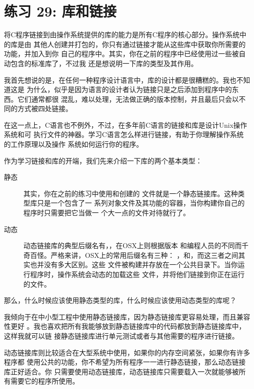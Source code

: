 \chapter{练习 29: 库和链接}

将C程序链接到由操作系统提供的库的能力是所有C程序的核心部分。操作系统中的库是由
其他人创建并打包的，你只有通过链接才能从这些库中获取你所需要的功能，并加入到你
自己的程序中。其实，你在之前的程序中已经使用过一些被自动包含的标准库了，不过我
还是想说明一下库的类型及其作用。

我首先想说的是，在任何一种程序设计语言中，库的设计都是很糟糕的。我也不知道这是
为什么，似乎是因为语言的设计者认为链接只是之后添加到程序中的东西。它们通常都很
混乱，难以处理，无法做正确的版本控制，并且最后只会以不同的方式被四处链接。

在这一点上，C语言也不例外，不过，在多年前C语言的链接和库是设计Unix操作系统和可
执行文件的神器。学习C语言怎么样进行链接，有助于你理解操作系统的工作原理以及操作
系统如何运行你的程序。

作为学习链接和库的开端，我们先来介绍一下库的两个基本类型：

\begin{description}
\item[静态] 其实，你在之前的练习中使用和创建的
    文件就是一个静态链接库。这种类型库只是一个包含了一
    系列对象文件及其功能的容器，当你构建你自己的程序时只需要把它当做一
    个大一点的文件对待就行了。
\item[动态] 动态链接库的典型后缀名有，，在OSX上则根据版本
    和编程人员的不同而千奇百怪。严格来讲，OSX上的常用后缀名有三种：
    ，和，而这三者之间其实也并没有多大区别。这些
    文件被构建并存放在一个公共目录下。当你运行程序时，操作系统会动态的加载这些
    文件，并将他们链接到你正在运行的文件。
\end{description}

那么，什么时候应该使用静态类型的库，什么时候应该使用动态类型的库呢？

我倾向于在中小型工程中使用静态链接库，因为静态链接库更容易处理，而且兼容性更好
。我也喜欢把所有我能够放到静态链接库中的代码都放到静态链接库中，这样我就可以链
接静态链接库进行单元测试或者与其他需要的程序进行链接。

动态链接库则比较适合在大型系统中使用，如果你的内存空间紧张，如果你有许多程序都
使用公共的功能，你不希望为所有程序一一进行静态链接，那么动态链接库正好适合。你
只需要使用动态链接库，动态链接库只需要载入一次就能够被所有需要它的程序所使用。

